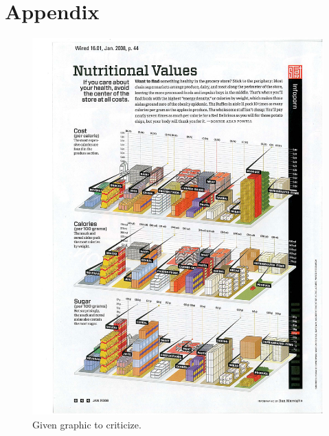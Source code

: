 \documentclass[a4paper]{scrartcl}
\begin{document}




\newpage
\clearpage
\section{Appendix}

\begin{figure}[h]
  \centering
	\includegraphics[scale=0.20]{assignmentGraphic.jpg}
  \caption{Given graphic to criticize.}
	\label{fig:assignmentGraphic}
\end{figure}
\end{document}
